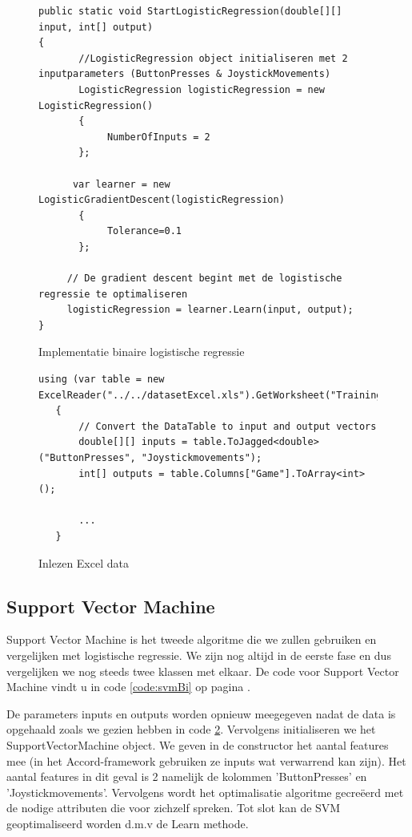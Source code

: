 \begin{figure}[]
	\renewcommand{\figurename}{Code}
\begin{lstlisting}
public static void StartLogisticRegression(double[][] input, int[] output)
{
       //LogisticRegression object initialiseren met 2 inputparameters (ButtonPresses & JoystickMovements)
       LogisticRegression logisticRegression = new LogisticRegression()
       {
       		NumberOfInputs = 2
       };
       
      var learner = new LogisticGradientDescent(logisticRegression)
       {
            Tolerance=0.1
       };
    
     // De gradient descent begint met de logistische regressie te optimaliseren
     logisticRegression = learner.Learn(input, output);
}

\end{lstlisting}
\caption{Implementatie binaire logistische regressie}
\label{code:linaireRegressieTweeKlassen}
\end{figure}
\begin{figure}[]
	\renewcommand{\figurename}{Code}
	\begin{lstlisting}
using (var table = new ExcelReader("../../datasetExcel.xls").GetWorksheet("Training"))
   {
       // Convert the DataTable to input and output vectors
       double[][] inputs = table.ToJagged<double>("ButtonPresses", "Joystickmovements");
       int[] outputs = table.Columns["Game"].ToArray<int>();
       
       ...
   }
	\end{lstlisting}
	\caption{Inlezen Excel data}
	\label{code:dataInlezen}
\end{figure}

\newpage
\subsection{Support Vector Machine}
\label{sec:supportvectormachine}
Support Vector Machine is het tweede algoritme die we zullen gebruiken en vergelijken met logistische regressie. 
We zijn nog altijd in de eerste fase en dus vergelijken we nog steeds twee klassen met elkaar. 
De code voor Support Vector Machine vindt u in code \ref{code:svmBi} op pagina \pageref{code:svmBi}. 

De parameters inputs en outputs worden opnieuw meegegeven nadat de data is opgehaald zoals we gezien hebben in code \ref{code:dataInlezen}. Vervolgens initialiseren we het SupportVectorMachine object. We geven in de constructor het aantal features mee (in het Accord-framework gebruiken ze inputs wat verwarrend kan zijn). Het aantal features in dit geval is 2 namelijk de kolommen 'ButtonPresses' en 'Joystickmovements'. Vervolgens wordt het optimalisatie algoritme gecreëerd met de nodige attributen die voor zichzelf spreken. Tot slot kan de SVM geoptimaliseerd worden d.m.v de Learn methode.  

